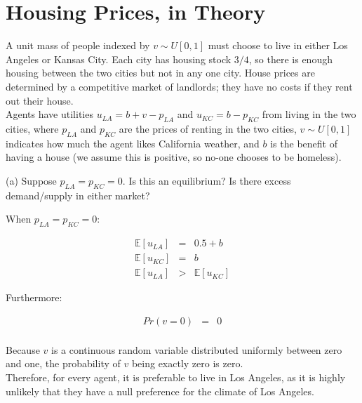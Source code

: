 \section{Housing Prices, in Theory}

A unit mass of people indexed by \( v \sim U[0,1] \) must choose to live in either Los Angeles or Kansas City. Each city has housing stock \( 3/4 \), so there is enough housing between the two cities but not in any one city. House prices are determined by a competitive market of landlords; they have no costs if they rent out their house.\\

Agents have utilities \( u_{LA} = b + v - p_{LA} \) and \( u_{KC} = b - p_{KC} \) from living in the two cities, where \( p_{LA} \) and \( p_{KC} \) are the prices of renting in the two cities, \( v \sim U[0,1] \) indicates how much the agent likes California weather, and \( b \) is the benefit of having a house (we assume this is positive, so no-one chooses to be homeless).



\begin{tcolorbox}
    (a) Suppose \( p_{LA} = p_{KC} = 0 \). Is this an equilibrium? Is there excess demand/supply in either market?
\end{tcolorbox}

When \( p_{LA} = p_{KC} = 0 \):

\begin{eqnarray*}
    \mathbb{E}[u_{LA}] &=& 0.5 + b\\
    \mathbb{E}[u_{KC}] &=& b\\
    \mathbb{E}[u_{LA}] &>& \mathbb{E}[u_{KC}]
\end{eqnarray*}

Furthermore:

\begin{eqnarray*}
    Pr(v = 0) &=& 0\\
\end{eqnarray*}


Because \(v\) is a continuous random variable distributed uniformly between zero and one, the probability of \(v\) being exactly zero is zero.\\

Therefore, for every agent, it is preferable to live in Los Angeles, as it is highly unlikely that they have a null preference for the climate of Los Angeles.\\

